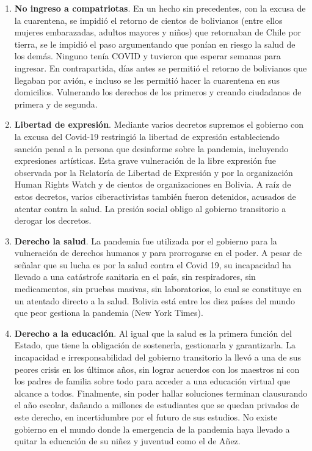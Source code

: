 \documentclass[a4paper, nobind]{templates/ociamthesis}
\begin{document}
\begin{enumerate}
\item
  \textbf{No ingreso a compatriotas}. En un hecho sin precedentes, con la excusa de la cuarentena, se impidió el retorno de cientos de bolivianos (entre ellos mujeres embarazadas, adultos mayores y niños) que retornaban de Chile por tierra, se le impidió el paso argumentando que ponían en riesgo la salud de los demás. Ninguno tenía COVID y tuvieron que esperar semanas para ingresar. En contrapartida, días antes se permitió el retorno de bolivianos que llegaban por avión, e incluso se les permitió hacer la cuarentena en sus domicilios. Vulnerando los derechos de los primeros y creando ciudadanos de primera y de segunda.
\item
  \textbf{Libertad de expresión}. Mediante varios decretos supremos el gobierno con la excusa del Covid-19 restringió la libertad de expresión estableciendo sanción penal a la persona que desinforme sobre la pandemia, incluyendo expresiones artísticas. Esta grave vulneración de la libre expresión fue observada por la Relatoría de Libertad de Expresión y por la organización Human Rights Watch y de cientos de organizaciones en Bolivia. A raíz de estos decretos, varios ciberactivistas también fueron detenidos, acusados de atentar contra la salud. La presión social obligo al gobierno transitorio a derogar los decretos.
\item
  \textbf{Derecho la salud}. La pandemia fue utilizada por el gobierno para la vulneración de derechos humanos y para prorrogarse en el poder. A pesar de señalar que su lucha es por la salud contra el Covid 19, su incapacidad ha llevado a una catástrofe sanitaria en el país, sin respiradores, sin medicamentos, sin pruebas masivas, sin laboratorios, lo cual se constituye en un atentado directo a la salud. Bolivia está entre los diez países del mundo que peor gestiona la pandemia (New York Times).
\item
  \textbf{Derecho a la educación}. Al igual que la salud es la primera función del Estado, que tiene la obligación de sostenerla, gestionarla y garantizarla. La incapacidad e irresponsabilidad del gobierno transitorio la llevó a una de sus peores crisis en los últimos años, sin lograr acuerdos con los maestros ni con los padres de familia sobre todo para acceder a una educación virtual que alcance a todos. Finalmente, sin poder hallar soluciones terminan clausurando el año escolar, dañando a millones de estudiantes que se quedan privados de este derecho, en incertidumbre por el futuro de sus estudios. No existe gobierno en el mundo donde la emergencia de la pandemia haya llevado a quitar la educación de su niñez y juventud como el de Añez.

\end{enumerate}
\end{document}
